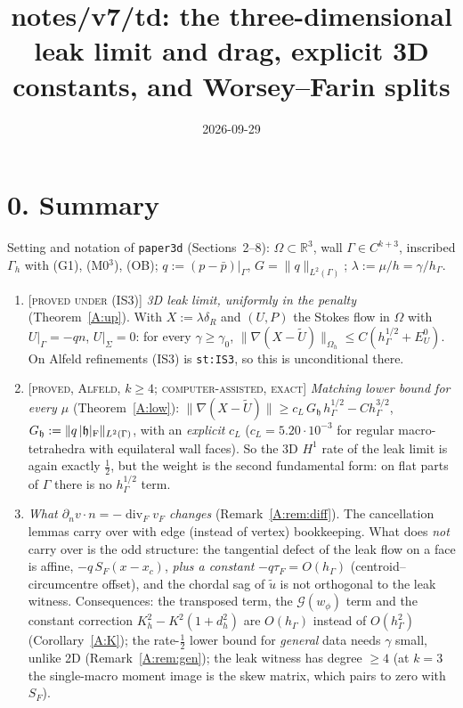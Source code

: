 \documentclass[11pt,reqno]{amsart}
\theoremstyle{plain}
\theoremstyle{definition}
\newcommand{\status}[1]{\textup{\textsc{[#1]}}}
\newcommand{\R}{\mathbb R}
\newcommand{\hG}{h_\Gamma}
\newcommand{\Gh}{\Gamma_h}
\newcommand{\Oh}{\Omega_h}
\newcommand{\dn}{\partial_n}
\newcommand{\ut}{\tilde u}
\newcommand{\pbar}{\bar p}
\newcommand{\norm}[1]{\lVert #1\rVert}
\renewcommand{\div}{\operatorname{div}}
\newcommand{\Gc}{\mathcal G}
\newcommand{\hh}{\mathfrak h}
\newcommand{\Ut}{\tilde U}
\begin{document}
\title[notes/v7/td: 3D leak limit, drag, constants]{notes/v7/td: the three-dimensional leak limit and drag, explicit 3D constants, and Worsey--Farin splits}
\date{2026-09-29}
\maketitle

\section*{0. Summary}
Setting and notation of \texttt{paper3d} (Sections~2--8): $\Omega\subset\R^3$, wall $\Gamma\in C^{k+3}$, inscribed $\Gh$ with (G1), (M0$^3$), (OB); $q:=(p-\pbar)|_\Gamma$, $G=\norm q_{L^2(\Gamma)}$; $\lambda:=\mu/h=\gamma/\hG$.
\begin{enumerate}[label=(\alph*)]
\item \status{proved under (IS3)} \emph{3D leak limit, uniformly in the penalty} (Theorem~\ref{A:up}). With $X:=\lambda\delta_R$ and $(U,P)$ the Stokes flow in $\Omega$ with $U|_\Gamma=-qn$, $U|_\Sigma=0$: for every $\gamma\ge\gamma_0$, $\norm{\nabla(X-\Ut)}_{\Oh}\le C(\hG^{1/2}+E^0_U)$. On Alfeld refinements (IS3) is \texttt{st:IS3}, so this is unconditional there.
\item \status{proved, Alfeld, $k\ge4$; computer-assisted, exact} \emph{Matching lower bound for every $\mu$} (Theorem~\ref{A:low}): $\norm{\nabla(X-\Ut)}\ge c_L\,G_\hh\,\hG^{1/2}-C\hG^{3/2}$, $G_\hh:=\norm{q\,|\hh|_{\rm F}}_{L^2(\Gamma)}$, with an \emph{explicit} $c_L$ ($c_L=5.20\cdot10^{-3}$ for regular macro-tetrahedra with equilateral wall faces). So the 3D $H^1$ rate of the leak limit is again exactly $\frac12$, but the weight is the second fundamental form: on flat parts of $\Gamma$ there is no $\hG^{1/2}$ term.
\item \emph{What $\dn v\cdot n=-\div_F v_F$ changes} (Remark~\ref{A:rem:diff}). The cancellation lemmas carry over with edge (instead of vertex) bookkeeping. What does \emph{not} carry over is the odd structure: the tangential defect of the leak flow on a face is affine, $-q\,S_F(x-x_c)$, \emph{plus a constant} $-q\tau_F=O(\hG)$ (centroid--circumcentre offset), and the chordal sag of $\ut$ is not orthogonal to the leak witness. Consequences: the transposed term, the $\Gc(w_\phi)$ term and the constant correction $K_h^2-K^2(1+d_h^2)$ are $O(\hG)$ instead of $O(\hG^2)$ (Corollary~\ref{A:K}); the rate-$\frac12$ lower bound for \emph{general} data needs $\gamma$ small, unlike 2D (Remark~\ref{A:rem:gen}); the leak witness has degree $\ge4$ (at $k=3$ the single-macro moment image is the skew matrix, which pairs to zero with $S_F$).

\end{enumerate}
\end{document}
